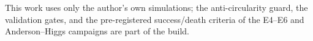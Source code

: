 \documentclass[aps,prd,reprint,nofootinbib,superscriptaddress,floatfix]{revtex4-2}
\begin{document}
\begin{acknowledgments}
This work uses only the author's own simulations; the anti-circularity guard, the
validation gates, and the pre-registered success/death criteria of the E4--E6 and
Anderson--Higgs campaigns are part of the build.
\end{acknowledgments}



\end{document}
